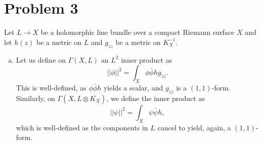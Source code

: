 \documentclass{../mathnotes}
\begin{document}
\section*{Problem 3}

Let $L\to X$ be a holomorphic line bundle over a compact Riemann surface $X$ and let $h(z)$ be a metric on $L$ and $g_{\bar zz}$ be a metric on $K_X^{-1}$.
\begin{enumerate}[(a)]
    \item Let us define on $\Gamma(X,L)$ an $L^2$ inner product as
        \[||\phi||^2=\int_X\phi\bar\phi hg_{\bar zz}.\]
        This is well-defined, as $\phi\bar\phi h$ yields a scalar, and $g_{\bar zz}$ is a $(1,1)$-form. Similarly, on $\Gamma(X,L\otimes \overline{K_{X}})$, we
        define the inner product as
        \[||\psi||^2=\int_X\psi\bar\psi h,\]
        which is well-defined as the components in $L$ cancel to yield, again, a $(1,1)$-form.


\end{enumerate}
\end{document}

